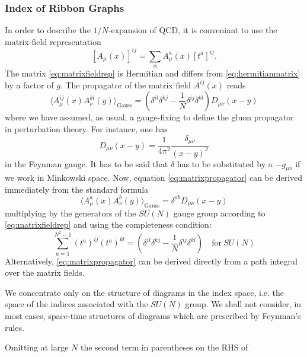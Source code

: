 \subsubsection{Index of Ribbon Graphs}
In order to describe the $1/N$-expansion of QCD, it is conveniant to use the
matrix-field representation
\begin{equation}
  \left[A_{\mu}(x)\right]^{ij} = \sum_{\alpha} A^a_{\mu}(x)\left[t^a\right]^{ij}.
  \label{eq:matrixfieldrep}
\end{equation}
The matrix \eqref{eq:matrixfieldrep} is Hermitian and differs from
\eqref{eq:hermitianmatrix} by a factor of $g$.
The propagator of the matrix field $A^{ij}(x)$ reads
\begin{equation}
  \langle A^{ij}_\mu(x)A^{kl}_\nu(y)\rangle_{\mathrm{Gauss}}
  = \left(\delta^{il}\delta^{kj}
    - \frac{1}{N}\delta^{ij}\delta^{kl}\right)D_{\mu\nu}(x-y)
    \label{eq:matrixpropagator}
\end{equation}
where we have assumed, as usual, a gauge-fixing to define the gluon propagator
in perturbation theory. For instance, one has
\begin{equation}
  D_{\mu\nu}(x-y) = \frac{1}{4\pi^2}\frac{\delta_{\mu\nu}}{(x-y)^2}
\end{equation}
in the Feynman gauge. It has to be said that $\delta$ has to be substituted by
a $-g_{\mu\nu}$ if we work in Minkowski space. Now, equation
\eqref{eq:matrixpropagator} can be derived immediately from the standard
formula
\begin{equation}
  \langle A^{a}_\mu(x)A^{b}_\nu(y)\rangle_{\mathrm{Gauss}}
  = \delta^{ab}D_{\mu\nu}(x-y)
\end{equation}
multiplying by the generators of the $SU(N)$ gauge group according to
\eqref{eq:matrixfieldrep} and using the completeness condition:
\begin{equation}
  \sum_{a=1}^{N^2-1}(t^a)^{ij}(t^a)^{kl} = \left(\delta^{il}\delta^{kj}
  - \frac{1}{N}\delta^{ij}\delta^{kl}\right)\quad\boxed{\mathrm{for}\  SU(N)}
\end{equation}
Alternatively, \eqref{eq:matrixpropagator} can be derived directly from a path
integral over the matrix fields.
\par We concentrate only on the structure of diagrams in the index space, i.e.
the space of the indices associated with the $SU(N)$ group. We shall not
consider, in most cases, space-time structures of diagrams which are prescribed
by Feynman's rules.
\par Omitting at large $N$ the second term in parentheses on the RHS of

